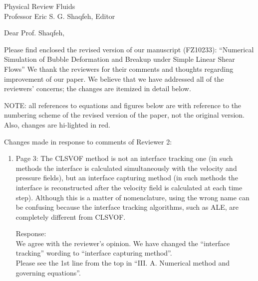 \documentclass{letter}
\date{\today}
\begin{document}
\begin{letter}{
Physical Review Fluids\\
Professor Eric S. G. Shaqfeh, Editor\\}

\opening{Dear Prof. Shaqfeh,}

Please find enclosed the revised version of our manuscript (FZ10233):
``Numerical Simulation of Bubble Deformation and Breakup under Simple Linear Shear Flows''
We thank the reviewers for their comments and thoughts regarding improvement 
of our paper. We believe that we have addressed all of the reviewers’ 
concerns; the changes are itemized in detail below.


\par\noindent
NOTE: all references to equations and figures below are with
reference to the numbering scheme of the revised version of the paper,
not the original version.  Also, changes are hi-lighted in red.
\par\noindent

Changes made in response to comments of Reviewer 2: 
\begin{enumerate}

\item
\textsf
{Page 3: The CLSVOF method is not an interface tracking one (in such methods
the interface is calculated simultaneously with the velocity and pressure
fields), but an interface capturing method (in such methods the interface is
reconstructed after the velocity field is calculated at each time step).
Although this is a matter of nomenclature, using the wrong name can be
confusing because the interface tracking algorithms, such as ALE, are
completely different from CLSVOF.}
\vspace{3 mm}

Response: \\
We agree with the reviewer's opinion. We have changed the ``interface tracking''
wording to ``interface capturing method''.
\\
Please see the 1st line from the top in ``I\hspace{-1.2pt}I\hspace{-1.2pt}I. A. Numerical method and governing equations''.
\\


\end{enumerate}
\end{letter}
\end{document}
